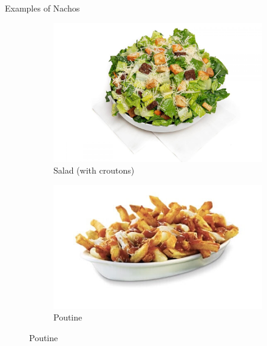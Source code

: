 \documentclass{beamer}
\begin{document}
\begin{frame}{Examples of Nachos}
    \begin{figure}
        \begin{subfigure}{.4\textwidth}
          \centering
          \includegraphics[width=\linewidth]{images/cube_rule_of_food/nachos/35_crouton_salad.jpg}
          \caption{\label{fig:crouton-salad}Salad (with croutons)}
        \end{subfigure}
        \begin{subfigure}{.5\textwidth}
          \centering
          \includegraphics[width=.8\linewidth]{images/cube_rule_of_food/nachos/35_poutine.jpg}
          \caption{\label{fig:poutine}Poutine}
        \end{subfigure}
    \end{figure}
\end{frame}
\end{document}
